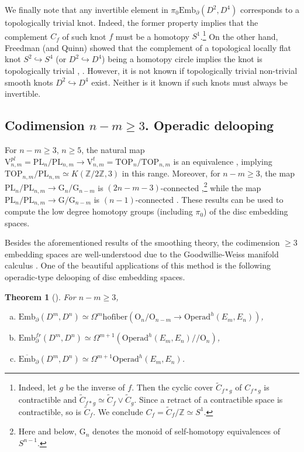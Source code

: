 \documentclass[11pt]{amsart}
\newtheorem{theorem}{Theorem}[section]
\theoremstyle{definition}
\newcommand{\Z}{{\mathbb Z}}
\newcommand{\Ebarmn}{{\overline{\mathrm{Emb}}}_\partial(D^m,D^n)}
\newcommand{\Embmn}{\mathrm{Emb}_\partial(D^m,D^n)}
\newcommand{\Embfrmn}{\mathrm{Emb}_\partial^{fr}(D^m,D^n)}
\newcommand{\Emb}{\mathrm{Emb}}
\newcommand{\Operad}{\mathrm{Operad}}
\newcommand{\PL}{\mathrm{PL}}
\newcommand{\TOP}{\mathrm{TOP}}
\newcommand{\OO}{\mathrm{O}}
\newcommand{\GG}{\mathrm{G}}
\newcommand{\VV}{\mathrm{V}}
\newcommand{\hofiber}{\mathrm{hofiber}}
\numberwithin{equation}{section}
\begin{document}
We finally note that any invertible element in $\pi_0\Emb_\partial(D^2,D^4)$ corresponds to a topologically trivial knot.  Indeed, the former property implies that the complement $C_f$ of such knot $f$ must be a homotopy $S^1$.\footnote{Indeed, let $g$ be the inverse of $f$. Then the cyclic cover $\tilde C_{f*g}$ of 
$C_{f*g}$ is contractible and $\tilde C_{f*g}\simeq \tilde C_f\vee\tilde C_g$. Since a retract of a contractible space is contractible, so is $\tilde C_f$. We conclude $C_f=\tilde C_f/\Z\simeq S^1$.\label{foot6}}
On the other hand, Freedman (and Quinn) showed that the complement of a topological locally flat knot $S^2\hookrightarrow S^4$ (or $D^2\hookrightarrow D^4$) being a homotopy circle implies the knot is topologically trivial
\cite[Theorem~6]{Freedman}, \cite[Theorem~11.7A]{FQ}. 
However, it is not known if topologically trivial non-trivial smooth knots $D^2\hookrightarrow D^4$ exist. Neither is it known if such knots must always be invertible.




\subsection{Codimension $n-m\geq 3$. Operadic delooping}\label{ss:cod3}

For $n-m\geq 3$, $n\geq 5$, the natural map $\VV^{pl}_{n,m}=\PL_n/\PL_{n,m}\to \VV^{t}_{n,m}= \TOP_n/\TOP_{n,m}$ is an equivalence \cite[Proposition~$(t/pl)$]{Lashof},
implying  $\TOP_{n,m}/\PL_{n,m}\simeq K(\Z/2\Z,3)$ in this range. Moreover,
for $n-m\geq 3$, the map $\PL_n/\PL_{n,m}\to \GG_n/\GG_{n-m}$ is $(2n-m-3)$-connected \cite[Theorem~5.1]{Millett},\footnote{Here and below, $\GG_n$ denotes the monoid of self-homotopy equivalences of $S^{n-1}$.} while the map $\PL_n/\PL_{n,m}\to \GG/\GG_{n-m}$
is $(n-1)$-connected \cite[Lemma~6.3]{Gauniyal}.  These results can be used to compute the low degree homotopy groups (including $\pi_0$) of
the disc embedding spaces. 

Besides the aforementioned results of the smoothing theory, the codimension $\geq 3$ embedding spaces are well-understood due to the Goodwillie-Weiss
manifold calculus \cite{GW,Weiss,WeissErr}. One of the beautiful applications of this method is the following operadic-type delooping of disc
embedding spaces.

\begin{theorem}[\cite{BW_conf_cat,DT,DTW}]\label{th:operad}
For $n-m\geq 3$,
\begin{enumerate}[(a)]
\item $\Embmn\simeq\Omega^m\hofiber\left(\OO_n/\OO_{n-m}\to \Operad^h(E_m,E_n)\right)$,
\item $\Embfrmn\simeq\Omega^{m+1}\left(\Operad^h(E_m,E_n)/\!\!/\OO_n\right)$,
\item $\Ebarmn\simeq \Omega^{m+1}\Operad^h(E_m,E_n)$.
\end{enumerate}
\end{theorem}
\end{document}
